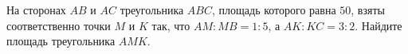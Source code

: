 \begin{ex}
	\begin{condition}
		На сторонах \( AB \) и \( AC \) треугольника \( ABC \), площадь которого равна \( 50 \), взяты соответственно точки \( M \) и \( K \) так, что \( AM : MB = 1 : 5 \), а \( AK : KC = 3 : 2 \). Найдите площадь треугольника \( AMK \).
	\end{condition}
\end{ex}